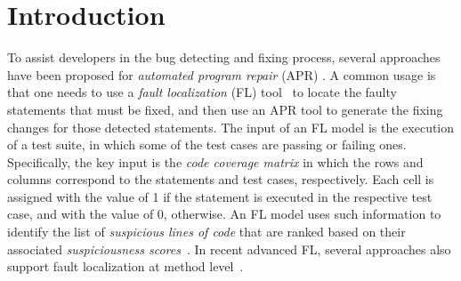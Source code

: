 \section{Introduction}

To assist developers in the bug detecting and fixing process, several
approaches have been proposed for {\em automated program repair} (APR)
\cite{LeGoues-icse12}. A common usage is that one needs to use a {\em
  fault localization} (FL) tool~\cite{fl-survey} to locate the faulty
statements that must be fixed, and then use an APR tool to generate
the fixing changes for those detected statements.
%
The input of an FL model is the execution of a test suite, in which
some of the test cases are passing or failing ones. Specifically, the
key input is the {\em code coverage matrix} in which the rows and
columns correspond to the statements and test cases, respectively.
Each cell is assigned with the value of 1 if the statement is executed
in the respective test case, and with the value of 0, otherwise.  An
FL model uses such information to identify the list of {\em suspicious
  lines of code} that are ranked based on their associated {\em
  suspiciousness scores}~\cite{fl-survey}. In recent advanced FL,
several approaches also support fault localization at method
level~\cite{DeepFL,icse21-fl}.


